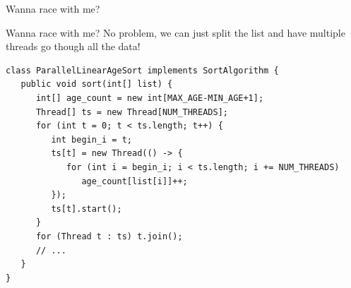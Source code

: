 \documentclass{beamer}
\begin{document}

\begin{frame}{Wanna race with me?}
	\begin{center}
	\end{center}
\end{frame}


\begin{frame}[fragile]{Wanna race with me?}
	No problem, we can just split the list and have multiple threads
	go though all the data!
	\begin{lstlisting}
class ParallelLinearAgeSort implements SortAlgorithm {
   public void sort(int[] list) {
      int[] age_count = new int[MAX_AGE-MIN_AGE+1];
      Thread[] ts = new Thread[NUM_THREADS];
      for (int t = 0; t < ts.length; t++) {
         int begin_i = t;
         ts[t] = new Thread(() -> {
            for (int i = begin_i; i < ts.length; i += NUM_THREADS)
               age_count[list[i]]++;
         });
         ts[t].start();
      }
      for (Thread t : ts) t.join();
      // ...
   }
}
	\end{lstlisting}
\end{frame}

\end{document}
